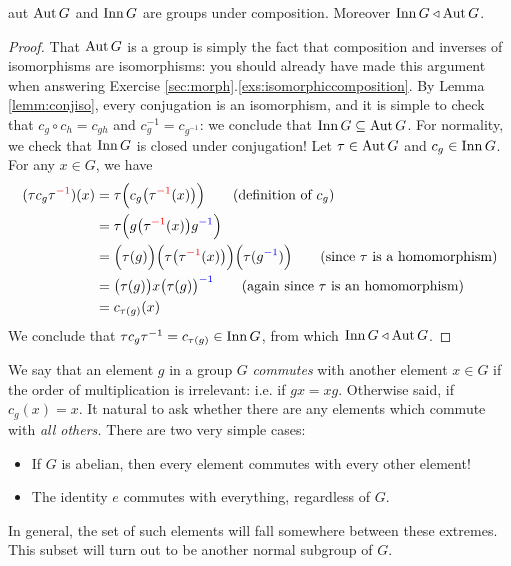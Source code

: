 \begin{thm}{}{aut}
	$\operatorname{Aut} G$ and $\operatorname{Inn} G$ are groups under composition. Moreover $\operatorname{Inn} G\triangleleft\operatorname{Aut} G$.
\end{thm}

\begin{proof}
	That $\operatorname{Aut} G$ is a group is simply the fact that composition and inverses of isomorphisms are isomorphisms: you should already have made this argument when answering Exercise \ref*{sec:morph}.\ref{exs:isomorphiccomposition}. By Lemma \ref{lemm:conjiso}, every conjugation is an isomorphism, and it is simple to check that $c_g\circ c_h=c_{gh}$ and $c_g^{-1}=c_{g^{-1}}$: we conclude that $\operatorname{Inn} G\subseteq \operatorname{Aut} G$.\smallbreak
	For normality, we check that $\operatorname{Inn} G$ is closed under conjugation! Let $\tau\in\operatorname{Aut} G$ and $c_g\in\operatorname{Inn} G$. For any $x\in G$, we have\footnotemark
	\begin{align*}
		(\tau c_g\tau^{\textcolor{red}{-1}})(x)&=\tau\Bigl(c_g\bigl(\tau^{\textcolor{red}{-1}}(x)\bigr)\Bigr)\tag{definition of $c_g$}\\
		&=\tau\Bigl(g\bigl(\tau^{\textcolor{red}{-1}}(x)\bigr)g^{\textcolor{blue}{-1}}\Bigr)\\
		&=\Bigl(\tau(g)\Bigr)\Bigl(\tau\bigl(\tau^{\textcolor{red}{-1}}(x)\bigr)\Bigr)\Bigl(\tau(g^{\textcolor{blue}{-1}})\Bigr)\tag*{(since $\tau$ is a homomorphism)}\\
		&=\bigl(\tau(g)\bigr)x\bigl(\tau(g)\bigr)^{\textcolor{blue}{-1}}\tag*{(again since $\tau$ is an homomorphism)}\\
		&=c_{\tau(g)}(x)
	\end{align*}
	We conclude that $\tau c_g\tau^{-1}=c_{\tau(g)}\in \operatorname{Inn} G$, from which $\operatorname{Inn} G\triangleleft\operatorname{Aut} G$.
\end{proof}

\vspace{-2pt}


\goodbreak



We say that an element $g$ in a group $G$ \emph{commutes} with another element $x\in G$ if the order of multiplication is irrelevant: i.e. if $gx=xg$. Otherwise said, if $c_g(x)=x$. It natural to ask whether there are any elements which commute with \emph{all others.} There are two very simple cases:
\begin{itemize}
  \item If $G$ is abelian, then every element commutes with every other element!
  \item The identity $e$ commutes with everything, regardless of $G$.
\end{itemize}
In general, the set of such elements will fall somewhere between these extremes. This subset will turn out to be another normal subgroup of $G$.

